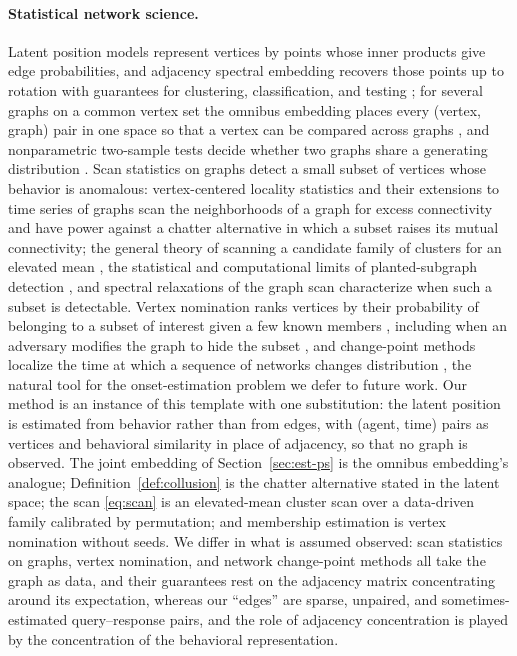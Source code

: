 \paragraph{Statistical network science.}
Latent position models represent vertices by points whose inner products give edge probabilities, and adjacency spectral embedding recovers those points up to rotation with guarantees for clustering, classification, and testing \citep{athreya2018statistical,lyzinski2014perfect,lyzinski2017community,priebe2019two}; for several graphs on a common vertex set the omnibus embedding places every (vertex, graph) pair in one space so that a vertex can be compared across graphs \citep{levin2017omnibus}, and nonparametric two-sample tests decide whether two graphs share a generating distribution \citep{tang2017nonparametric}. Scan statistics on graphs detect a small subset of vertices whose behavior is anomalous: vertex-centered locality statistics \citep{priebe2005scan,rukhin2011comparative} and their extensions to time series of graphs \citep{park2013anomaly,wang2014locality,chen2025multiple} scan the neighborhoods of a graph for excess connectivity and have power against a chatter alternative in which a subset raises its mutual connectivity; the general theory of scanning a candidate family of clusters for an elevated mean \citep{glaz2001scan,kulldorff1997spatial,ariascastro2011detection}, the statistical and computational limits of planted-subgraph detection \citep{verzelen2015community,hajek2015computational}, and spectral relaxations of the graph scan \citep{sharpnack2016detecting} characterize when such a subset is detectable. Vertex nomination ranks vertices by their probability of belonging to a subset of interest given a few known members \citep{fishkind2015vertex}, including when an adversary modifies the graph to hide the subset \citep{agterberg2020vertex}, and change-point methods localize the time at which a sequence of networks changes distribution \citep{padilla2022change,wang2021optimal}, the natural tool for the onset-estimation problem we defer to future work. Our method is an instance of this template with one substitution: the latent position is estimated from behavior rather than from edges, with (agent, time) pairs as vertices and behavioral similarity in place of adjacency, so that no graph is observed. The joint embedding of Section~\ref{sec:est-ps} is the omnibus embedding's analogue; Definition~\ref{def:collusion} is the chatter alternative stated in the latent space; the scan \eqref{eq:scan} is an elevated-mean cluster scan over a data-driven family calibrated by permutation; and membership estimation is vertex nomination without seeds. We differ in what is assumed observed: scan statistics on graphs, vertex nomination, and network change-point methods all take the graph as data, and their guarantees rest on the adjacency matrix concentrating around its expectation, whereas our ``edges'' are sparse, unpaired, and sometimes-estimated query--response pairs, and the role of adjacency concentration is played by the concentration of the behavioral representation.
